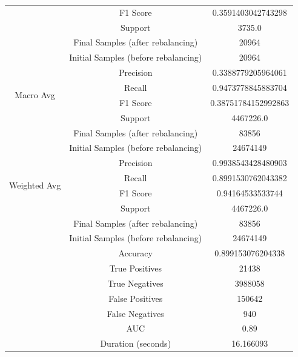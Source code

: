 \begin{longtable}{|c|c|c|}
 & F1 Score & 0.3591403042743298 \\
 & Support & 3735.0 \\
 & Final Samples (after rebalancing) & 20964 \\
 & Initial Samples (before rebalancing) & 20964 \\
\hline
\multirow{4}{*}{Macro Avg} & Precision & 0.3388779205964061 \\
 & Recall & 0.9473778845883704 \\
 & F1 Score & 0.38751784152992863 \\
 & Support & 4467226.0 \\
 & Final Samples (after rebalancing) & 83856 \\
 & Initial Samples (before rebalancing) & 24674149 \\
\hline
\multirow{4}{*}{Weighted Avg} & Precision & 0.9938543428480903 \\
 & Recall & 0.8991530762043382 \\
 & F1 Score & 0.94164533533744 \\
 & Support & 4467226.0 \\
 & Final Samples (after rebalancing) & 83856 \\
 & Initial Samples (before rebalancing) & 24674149 \\
\hline
& Accuracy & 0.899153076204338 \\ \hline
& True Positives & 21438 \\ \hline
& True Negatives & 3988058 \\ \hline
& False Positives & 150642 \\ \hline
& False Negatives & 940 \\ \hline
& AUC & 0.89 \\ \hline
& Duration (seconds) & 16.166093 \\ \hline
\end{longtable}


